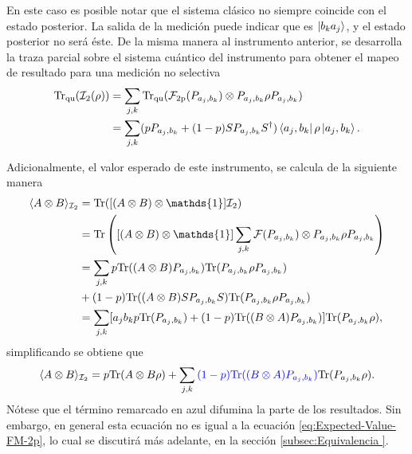 En este caso es posible notar que el sistema clásico no siempre coincide con el estado posterior. La salida de la medición puede indicar que es $\ket{b_k a_j}$, y el estado posterior no será éste. De la misma manera al instrumento anterior, se desarrolla la traza parcial sobre el sistema cuántico del instrumento para obtener el mapeo de resultado  para una medición no selectiva \begin{equation}\label{eq:tr_q_second-instrument-2p}
    \begin{split}
        {\rm Tr}_{\text{qu}}(\mathcal{I}_2(\rho))&=\sum_{j,k}{\rm Tr}_{\text{qu}}(\mathcal{F}_{2\text{p}}(P_{a_j,b_k})\otimes P_{a_j,b_k} \rho P_{a_j,b_k})\\
        &=\sum_{j,k} (pP_{a_j,b_k}+(1-p)SP_{a_j,b_k}S^\dagger) \bra{a_j,b_k} \rho \ket{a_j,b_k}.\\
    \end{split}
\end{equation} 



Adicionalmente, el valor esperado de este instrumento, se calcula de la siguiente manera\begin{equation*}
    \begin{split}
        \la A\otimes B \ra_{\mathcal{I}_2}&=\tr([(A\otimes B) \otimes \mathds{1}]\mathcal{I}_2)\\
        &=\tr\left([(A\otimes B) \otimes \mathds{1}]\sum_{j,k}\mathcal{F}(P_{a_j,b_k})\otimes P_{a_j,b_k} \rho P_{a_j,b_k}\right)\\
        &=\sum_{j,k} p\tr((A\otimes B)P_{a_j,b_k}) \tr (P_{a_j,b_k} \rho P_{a_j,b_k})\\&
        +(1-p )\tr((A\otimes B)SP_{a_j,b_k}S) \tr(P_{a_j,b_k} \rho P_{a_j,b_k})\\
        &=\sum_{j,k}[a_{j} b_k p\tr(P_{a_j,b_k})+(1-p)\tr( (B\otimes A)P_{a_j,b_k}) ]\tr(P_{a_j,b_k} \rho),\\
    \end{split}
\end{equation*}simplificando se obtiene que \begin{equation}\label{eq:expectationvalueSecondInstrument2p}
    \begin{split}
        \langle A\otimes B \rangle_{\mathcal{I}_2}&=p{\rm Tr}(A\otimes B\rho)+\sum_{j,k}{\color{blue}(1-p){\rm Tr}( (B\otimes A)P_{a_j,b_k})}{\rm Tr}(P_{a_j,b_k} \rho). \\
    \end{split}
\end{equation}
Nótese que el término remarcado en azul difumina la parte de los resultados. Sin embargo, en general esta ecuación no es igual a la ecuación {\eqref{eq:Expected-Value-FM-2p}}, lo cual se discutirá más adelante, en la sección {\ref{subsec:Equivalencia }}.



